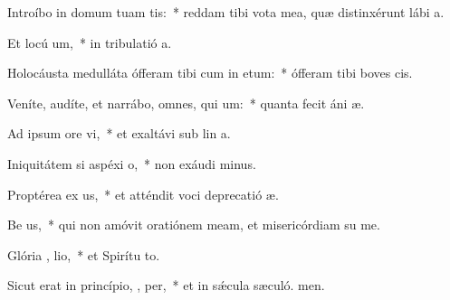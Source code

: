 \item Introíbo in domum tuam  tis:~* reddam tibi vota mea, quæ distinxérunt lábi a.
\item Et locú   um,~* in tribulatió a.
\item Holocáusta medulláta ófferam tibi cum in etum:~* ófferam tibi boves  cis.
\item Veníte, audíte, et narrábo, omnes, qui  um:~* quanta fecit áni æ.
\item Ad ipsum ore  vi,~* et exaltávi sub lin a.
\item Iniquitátem si aspéxi   o,~* non exáudi minus.
\item Proptérea ex us,~* et atténdit voci deprecatió æ.
\item Be us,~* qui non amóvit oratiónem meam, et misericórdiam su  me.
\item Glória ,  lio,~* et Spirítu to.
\item Sicut erat in princípio,  ,  per,~* et in sǽcula sæculó. men.
